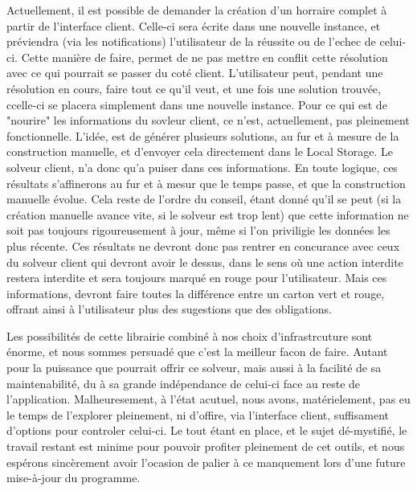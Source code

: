 Actuellement, il est possible de demander la création d'un horraire complet à partir de l'interface client. Celle-ci sera écrite dans une nouvelle instance, et préviendra (via les notifications) l'utilisateur de la réussite ou de l'echec de celui-ci.  Cette manière de faire, permet de ne pas mettre en conflit cette résolution avec ce qui pourrait se passer du coté client. L'utilisateur peut, pendant une résolution en cours, faire tout ce qu'il veut, et une fois une solution trouvée, ccelle-ci se placera simplement dans une nouvelle instance.
Pour ce qui est de "nourire" les informations du sovleur client, ce n'est, actuellement, pas pleinement fonctionnelle. L'idée, est de générer plusieurs solutions, 
au fur et à mesure de la construction manuelle, et d'envoyer cela directement dans le Local Storage. Le solveur client, n'a donc qu'a puiser dans ces informations.
En toute logique, ces résultats s'affinerons au fur et à mesur que le temps passe, et que la construction manuelle évolue. Cela reste de l'ordre du conseil, étant donné qu'il se peut (si la création manuelle avance vite, si le solveur est trop lent) que cette information ne soit pas toujours rigoureusement à jour, même si l'on priviligie les données les plus récente.  Ces résultats ne devront donc pas rentrer en concurance avec ceux du solveur client qui devront avoir le dessus, dans le sens où une action interdite restera interdite et sera toujours marqué en rouge pour l'utilisateur. 
Mais ces informations, devront faire toutes la différence entre un carton vert et rouge, offrant ainsi à l'utilisateur plus des sugestions que des obligations. 

Les possibilités de cette librairie combiné à nos choix d'infrastrcuture sont énorme, et nous sommes persuadé que c'est la meilleur facon de faire. Autant pour la puissance que pourrait offrir ce solveur, mais aussi à la facilité de sa maintenabilité, du à sa grande indépendance de celui-ci face au reste de l'application.
Malheuresement, à l'état acutuel, nous avons, matérielement, pas eu le temps de l'explorer pleinement, ni d'offire, via l'interface client, suffisament d'options pour controler celui-ci.
Le tout étant en place, et le sujet dé-mystifié, le travail restant est minime pour pouvoir profiter pleinement de cet outils, et nous espérons sincèrement avoir l'ocasion de palier à ce manquement lors d'une future mise-à-jour du programme.
